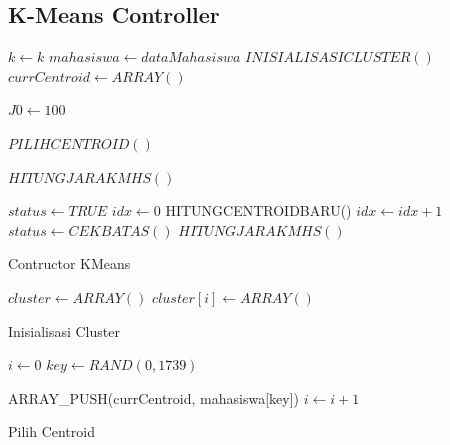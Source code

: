 \subsection{K-Means Controller}
\label{subsec:kmeans}

\begin{algorithm}[H]
  \begin{algorithmic}[1]
        \State $k \gets k$
        \State $mahasiswa \gets dataMahasiswa$
        \State $INISIALISASICLUSTER()$
        \State $currCentroid \gets ARRAY()$ 
        
        \State $J0 \gets 100$ 
        
        \State $PILIHCENTROID()$
        
        \State $HITUNGJARAKMHS()$
        
        \State $status \gets TRUE$
        \State $ idx \gets 0$
            \State HITUNGCENTROIDBARU()
            \State $idx \gets idx + 1$
            \State $status \gets CEKBATAS()$
            \State $HITUNGJARAKMHS()$
        \EndWhile
    \EndProcedure
  \end{algorithmic} 
  \caption{Contructor KMeans}
  \label{alg:contructor kmeans}
\end{algorithm}

\begin{algorithm}[H]
  \begin{algorithmic}[1]
        \State $cluster \gets ARRAY()$
            \State $cluster[i] \gets ARRAY()$
        \EndFor
    \EndProcedure
  \end{algorithmic} 
  \caption{Inisialisasi Cluster}
  \label{alg:inisialisasi cluster}
\end{algorithm}

\begin{algorithm}[H]
  \begin{algorithmic}[1]
        \State $i \gets 0$
            \State $key \gets RAND(0,1739)$ 
            
                    \State ARRAY\_PUSH(currCentroid, mahasiswa[key])
                    \State $i \gets i+1$
                \EndIf
            \EndIf
        \EndWhile
    \EndProcedure
  \end{algorithmic} 
  \caption{Pilih Centroid}
  \label{alg:pilih centroid}
\end{algorithm}


